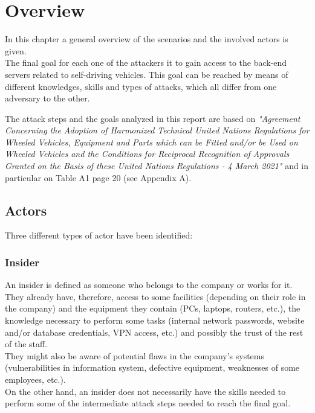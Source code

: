 %
\chapter{Overview}\label{ch:overview}

In this chapter a general overview of the scenarios and the involved actors is given.\\
The final goal for each one of the attackers it to gain access to the back-end servers related to self-driving vehicles. This goal can be reached by means of different knowledges, skills and types of attacks, which all differ from one adversary to the other.

\vspace{0.2cm}
\noindent The attack steps and the goals analyzed in this report are based on \textit{"Agreement Concerning the Adoption of Harmonized Technical United Nations Regulations for Wheeled Vehicles, Equipment and Parts which can be Fitted and/or be Used on Wheeled Vehicles and the Conditions for Reciprocal Recognition of Approvals Granted on the Basis of these United Nations Regulations - 4 March 2021"} and in particular on Table A1 page 20 (see Appendix A).

\section{Actors}
\noindent Three different types of actor have been identified:

\subsection*{Insider}
An insider is defined as someone who belongs to the company or works for it. They already have, therefore, access to some facilities (depending on their role in the company) and the equipment they contain (PCs, laptops, routers, etc.), the knowledge necessary to perform some tasks (internal network passwords, website and/or database credentials, VPN access, etc.) and possibly the trust of the rest of the staff.\\
They might also be aware of potential flaws in the company's systems (vulnerabilities in information system, defective equipment, weaknesses of some employees, etc.).\\
On the other hand, an insider does not necessarily have the skills needed to perform some of the intermediate attack steps needed to reach the final goal.

